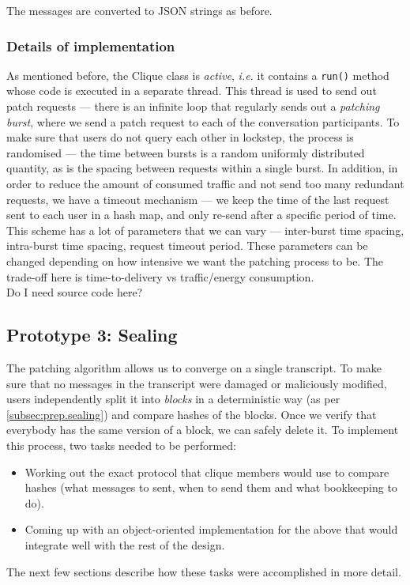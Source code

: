 \documentclass[a4paper, 12pt]{report}
\begin{document}
The messages are converted to JSON strings as before.


\subsubsection{Details of implementation}
As mentioned before, the Clique class is \emph{active}, \textit{i.e.} it contains a \texttt{run()} method whose code is executed in a separate thread. This thread is used to send out patch requests --- there is an infinite loop that regularly sends out a \emph{patching burst}, where we send a patch request to each of the conversation participants. To make sure that users do not query each other in lockstep, the process is randomised --- the time between bursts is a random uniformly distributed quantity, as is the spacing between requests within a single burst. In addition, in order to reduce the amount of consumed traffic and not send too many redundant requests, we have a timeout mechanism --- we keep the time of the last request sent to each user in a hash map, and only re-send after a specific period of time. \\

This scheme has a lot of parameters that we can vary --- inter-burst time spacing, intra-burst time spacing, request timeout period. These parameters can be changed depending on how intensive we want the patching process to be. The trade-off here is time-to-delivery vs traffic/energy consumption. \\

{\color{red} Do I need source code here?}


\subsection{Prototype 3: Sealing}
\label{subsec:impl.proto.sealing}
The patching algorithm allows us to converge on a single transcript. To make sure that no messages in the transcript were damaged or maliciously modified, users independently split it into \emph{blocks} in a deterministic way (as per \cref{subsec:prep.sealing}) and compare hashes of the blocks. Once we verify that everybody has the same version of a block, we can safely delete it. To implement this process, two tasks needed to be performed:

\begin{itemize}
    \item Working out the exact protocol that clique members would use to compare hashes (what messages to sent, when to send them and what bookkeeping to do).
    \item Coming up with an object-oriented implementation for the above that would integrate well with the rest of the design.
\end{itemize}
The next few sections describe how these tasks were accomplished in more detail.
\end{document}
